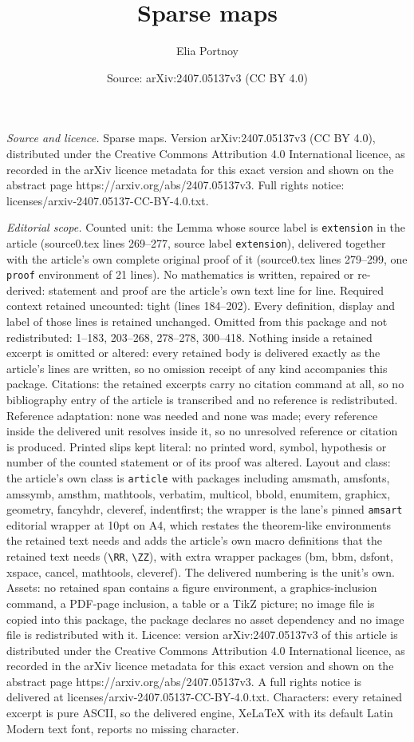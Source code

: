 \documentclass[10pt,a4paper]{amsart}
\title[Sparse maps]{Sparse maps}
\author{Elia Portnoy}
\date{Source: arXiv:2407.05137v3 (CC BY 4.0)}
\begin{document}
\maketitle

\noindent\emph{Source and licence.} Sparse maps. Version arXiv:2407.05137v3 (CC BY 4.0), distributed under the Creative Commons Attribution 4.0 International licence, as recorded in the arXiv licence metadata for this exact version and shown on the abstract page https://arxiv.org/abs/2407.05137v3. Full rights notice: licenses/arxiv-2407.05137-CC-BY-4.0.txt.\par\smallskip

\noindent\textit{Editorial scope.} Counted unit: the Lemma whose source label is \texttt{extension} in the article (source0.tex lines 269--277, source label \texttt{extension}), delivered together with the article's own complete original proof of it (source0.tex lines 279--299, one \texttt{proof} environment of 21 lines). No mathematics is written, repaired or re-derived: statement and proof are the article's own text line for line. Required context retained uncounted: tight (lines 184--202). Every definition, display and label of those lines is retained unchanged. Omitted from this package and not redistributed: 1--183, 203--268, 278--278, 300--418. Nothing inside a retained excerpt is omitted or altered: every retained body is delivered exactly as the article's lines are written, so no omission receipt of any kind accompanies this package. Citations: the retained excerpts carry no citation command at all, so no bibliography entry of the article is transcribed and no reference is redistributed. Reference adaptation: none was needed and none was made; every reference inside the delivered unit resolves inside it, so no unresolved reference or citation is produced. Printed slips kept literal: no printed word, symbol, hypothesis or number of the counted statement or of its proof was altered. Layout and class: the article's own class is \texttt{article} with packages including amsmath, amsfonts, amssymb, amsthm, mathtools, verbatim, multicol, bbold, enumitem, graphicx, geometry, fancyhdr, cleveref, indentfirst; the wrapper is the lane's pinned \texttt{amsart} editorial wrapper at 10pt on A4, which restates the theorem-like environments the retained text needs and adds the article's own macro definitions that the retained text needs (\texttt{\textbackslash RR}, \texttt{\textbackslash ZZ}), with extra wrapper packages (bm, bbm, dsfont, xspace, cancel, mathtools, cleveref). The delivered numbering is the unit's own. Assets: no retained span contains a figure environment, a graphics-inclusion command, a PDF-page inclusion, a table or a TikZ picture; no image file is copied into this package, the package declares no asset dependency and no image file is redistributed with it. Licence: version arXiv:2407.05137v3 of this article is distributed under the Creative Commons Attribution 4.0 International licence, as recorded in the arXiv licence metadata for this exact version and shown on the abstract page https://arxiv.org/abs/2407.05137v3. A full rights notice is delivered at licenses/arxiv-2407.05137-CC-BY-4.0.txt. Characters: every retained excerpt is pure ASCII, so the delivered engine, XeLaTeX with its default Latin Modern text font, reports no missing character.
\end{document}
